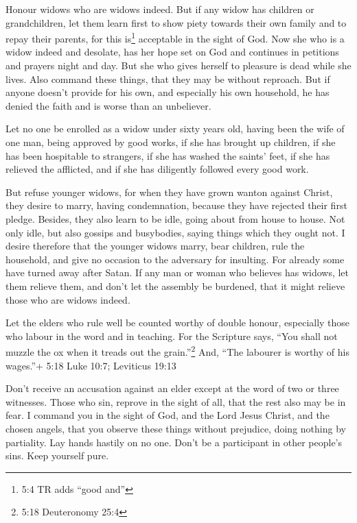  Honour widows who are widows indeed.  But if
any widow has children or grandchildren, let them learn first to show
piety towards their own family and to repay their parents, for this
is\footnote{5:4 TR adds ``good and''} acceptable in the sight of God.
 Now she who is a widow indeed and desolate, has her hope
set on God and continues in petitions and prayers night and day.
 But she who gives herself to pleasure is dead while she
lives.  Also command these things, that they may be without
reproach.  But if anyone doesn't provide for his own, and
especially his own household, he has denied the faith and is worse than
an unbeliever.

 Let no one be enrolled as a widow under sixty years old,
having been the wife of one man,  being approved by good
works, if she has brought up children, if she has been hospitable to
strangers, if she has washed the saints' feet, if she has relieved the
afflicted, and if she has diligently followed every good work.

 But refuse younger widows, for when they have grown wanton
against Christ, they desire to marry,  having condemnation,
because they have rejected their first pledge.  Besides,
they also learn to be idle, going about from house to house. Not only
idle, but also gossips and busybodies, saying things which they ought
not.  I desire therefore that the younger widows marry,
bear children, rule the household, and give no occasion to the adversary
for insulting.  For already some have turned away after
Satan.  If any man or woman who believes has widows, let
them relieve them, and don't let the assembly be burdened, that it might
relieve those who are widows indeed.

 Let the elders who rule well be counted worthy of double
honour, especially those who labour in the word and in teaching.
 For the Scripture says, ``You shall not muzzle the ox when
it treads out the grain.''\footnote{5:18 Deuteronomy 25:4} And, ``The
labourer is worthy of his wages.''+ 5:18 Luke 10:7; Leviticus 19:13

 Don't receive an accusation against an elder except at the
word of two or three witnesses.  Those who sin, reprove in
the sight of all, that the rest also may be in fear.  I
command you in the sight of God, and the Lord Jesus Christ, and the
chosen angels, that you observe these things without prejudice, doing
nothing by partiality.  Lay hands hastily on no one. Don't
be a participant in other people's sins. Keep yourself pure.

